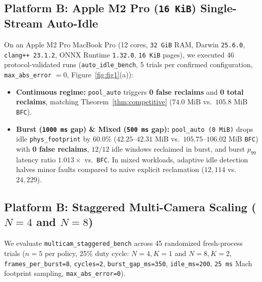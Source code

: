 \documentclass[sigconf,screen]{acmart}
\begin{document}
\subsection{Platform B: Apple M2 Pro (\texttt{16~KiB}) Single-Stream Auto-Idle}
On an Apple M2 Pro MacBook Pro (12 cores, \texttt{32~GiB} RAM, Darwin \texttt{25.6.0}, \texttt{clang++ 23.1.2}, ONNX Runtime \texttt{1.32.0}, \texttt{16~KiB} pages), we executed 46 protocol-validated runs (\texttt{auto\_idle\_bench}, 5 trials per confirmed configuration, \texttt{max\_abs\_error} $= 0$, Figure~\ref{fig:fig1}(a)):
\begin{itemize}
  \item \textbf{Continuous regime:} \texttt{pool\_auto} triggers \textbf{0 false reclaims} and \textbf{0 total reclaims}, matching Theorem~\ref{thm:competitive} ($74.0\text{ MiB}$ vs.\ $105.8\text{ MiB}$ \texttt{BFC}).
  \item \textbf{Burst (\texttt{1000~ms} gap) \& Mixed (\texttt{500~ms} gap):} \texttt{pool\_auto (0~MiB)} drops idle \texttt{phys\_footprint} by $60.0\%$ ($42.25\text{--}42.31\text{ MiB}$ vs.\ $105.75\text{--}106.02\text{ MiB}$ \texttt{BFC}) with \textbf{0 false reclaims}, $12/12$ idle windows reclaimed in burst, and burst $p_{99}$ latency ratio $1.013\times$ vs.\ \texttt{BFC}. In mixed workloads, adaptive idle detection halves minor faults compared to naive explicit reclamation ($12,114$ vs.\ $24,229$).
\end{itemize}

\subsection{Platform B: Staggered Multi-Camera Scaling ($N=4$ and $N=8$)}
We evaluate \texttt{multicam\_staggered\_bench} across 45 randomized fresh-process trials ($n=5$ per policy, 25\% duty cycle: $N=4, K=1$ and $N=8, K=2$, \texttt{frames\_per\_burst=8}, \texttt{cycles=2}, \texttt{burst\_gap\_ms=350}, \texttt{idle\_ms=200}, \texttt{25~ms} Mach footprint sampling, \texttt{max\_abs\_error=0}).
\end{document}
